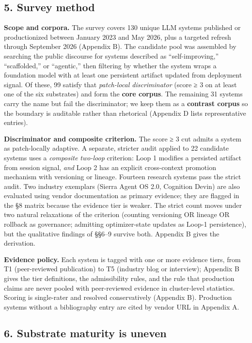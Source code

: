 \documentclass[
]{article}
\begin{document}
\subsection{5. Survey method}\label{survey-method}

\textbf{Scope and corpora.} The survey covers 130 unique LLM systems
published or productionized between January 2023 and May 2026, plus a
targeted refresh through September 2026 (Appendix B). The candidate pool
was assembled by searching the public discourse for systems described as
``self-improving,'' ``scaffolded,'' or ``agentic,'' then filtering by
whether the system wraps a foundation model with at least one persistent
artifact updated from deployment signal. Of these, 99 satisfy that
\emph{patch-local discriminator} (score ≥ 3 on at least one of the six
substrates) and form the \textbf{core corpus}. The remaining 31 systems
carry the name but fail the discriminator; we keep them as a
\textbf{contrast corpus} so the boundary is auditable rather than
rhetorical (Appendix D lists representative entries).

\textbf{Discriminator and composite criterion.} The score ≥ 3 cut admits
a system as patch-locally adaptive. A separate, stricter audit applied
to 22 candidate systems uses a \emph{composite two-loop} criterion: Loop
1 modifies a persisted artifact from session signal, \emph{and} Loop 2
has an explicit cross-context promotion mechanism with versioning or
lineage. Fourteen research systems pass the strict audit. Two industry
exemplars (Sierra Agent OS 2.0, Cognition Devin) are also evaluated
using vendor documentation as primary evidence; they are flagged in the
§8 matrix because the evidence tier is weaker. The strict count moves
under two natural relaxations of the criterion (counting versioning OR
lineage OR rollback as governance; admitting optimizer-state updates as
Loop-1 persistence), but the qualitative findings of §§6--9 survive
both. Appendix B gives the derivation.

\textbf{Evidence policy.} Each system is tagged with one or more
evidence tiers, from T1 (peer-reviewed publication) to T5 (industry blog
or interview); Appendix B gives the tier definitions, the admissibility
rules, and the rule that production claims are never pooled with
peer-reviewed evidence in cluster-level statistics. Scoring is
single-rater and resolved conservatively (Appendix B). Production
systems without a bibliography entry are cited by vendor URL in Appendix
A.

\subsection{6. Substrate maturity is
uneven}\label{substrate-maturity-is-uneven}
\end{document}
